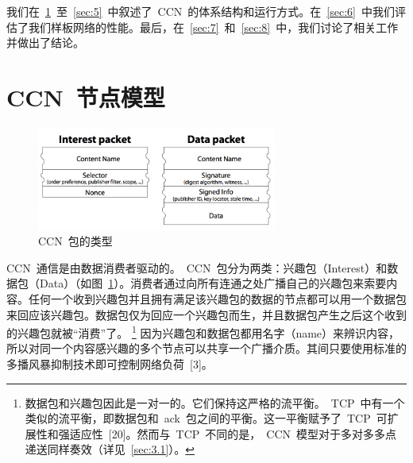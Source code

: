 我们在~\ref{sec:2}~至~\ref{sec:5}~中叙述了~CCN~的体系结构和运行方式。在~\ref{sec:6}~中我们评估了我们样板网络的性能。最后，在~\ref{sec:7}~和~\ref{sec:8}~中，我们讨论了相关工作并做出了结论。



\section{CCN~节点模型}
\label{sec:2}

\begin{figure}[htbp]
  \centering
  \includegraphics[width=0.7\textwidth]{images/packet_types}
  \caption{CCN~包的类型} 
  \label{packet_types}
\end{figure}

CCN~通信是由数据消费者驱动的。~CCN~包分为两类：兴趣包（Interest）和数据包（Data）（如图~\ref{packet_types}）。消费者通过向所有连通之处广播自己的兴趣包来索要内容。任何一个收到兴趣包并且拥有满足该兴趣包的数据的节点都可以用一个数据包来回应该兴趣包。数据包仅为回应一个兴趣包而生，并且数据包产生之后这个收到的兴趣包就被“消费”了。
\renewcommand\baselinestretch{1} %
\footnote{数据包和兴趣包因此是一对一的。它们保持这严格的流平衡。~TCP~中有一个类似的流平衡，即数据包和~ack~包之间的平衡。这一平衡赋予了~TCP~可扩展性和强适应性~[20]。然而与~TCP~不同的是，~CCN~模型对于多对多多点递送同样奏效（详见~\ref{sec:3.1}）。}
因为兴趣包和数据包都用名字（name）来辨识内容，所以对同一个内容感兴趣的多个节点可以共享一个广播介质。其间只要使用标准的多播风暴抑制技术即可控制网络负荷~[3]。%

